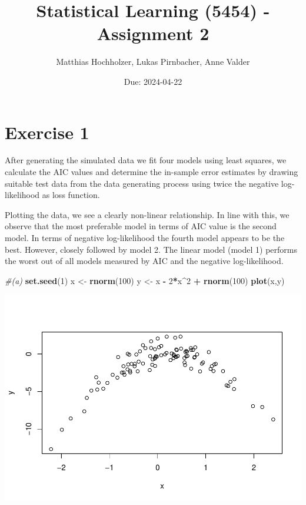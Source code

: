 \documentclass[
]{article}
\title{Statistical Learning (5454) - Assignment 2}
\author{Matthias Hochholzer, Lukas Pirnbacher, Anne Valder}
\date{Due: 2024-04-22}
\newenvironment{Shaded}{\begin{snugshade}}{\end{snugshade}}
\newcommand{\CommentTok}[1]{\textcolor[rgb]{0.56,0.35,0.01}{\textit{#1}}}
\newcommand{\DecValTok}[1]{\textcolor[rgb]{0.00,0.00,0.81}{#1}}
\newcommand{\FunctionTok}[1]{\textcolor[rgb]{0.13,0.29,0.53}{\textbf{#1}}}
\newcommand{\NormalTok}[1]{#1}
\newcommand{\OtherTok}[1]{\textcolor[rgb]{0.56,0.35,0.01}{#1}}
\newcommand{\SpecialCharTok}[1]{\textcolor[rgb]{0.81,0.36,0.00}{\textbf{#1}}}
\begin{document}
\maketitle

\hypertarget{exercise-1}{%
\section{Exercise 1}\label{exercise-1}}

After generating the simulated data we fit four models using least
squares, we calculate the AIC values and determine the in-sample error
estimates by drawing suitable test data from the data generating process
using twice the negative log-likelihood as loss function.

Plotting the data, we see a clearly non-linear relationship. In line
with this, we observe that the most preferable model in terms of AIC
value is the second model. In terms of negative log-likelihood the
fourth model appears to be the best. However, closely followed by model
2. The linear model (model 1) performs the worst out of all models
measured by AIC and the negative log-likelihood.

\begin{Shaded}
\begin{Highlighting}[]
\CommentTok{\#(a)}
\FunctionTok{set.seed}\NormalTok{(}\DecValTok{1}\NormalTok{)}
\NormalTok{x }\OtherTok{\textless{}{-}} \FunctionTok{rnorm}\NormalTok{(}\DecValTok{100}\NormalTok{)}
\NormalTok{y }\OtherTok{\textless{}{-}}\NormalTok{ x }\SpecialCharTok{{-}} \DecValTok{2}\SpecialCharTok{*}\NormalTok{x}\SpecialCharTok{\^{}}\DecValTok{2} \SpecialCharTok{+} \FunctionTok{rnorm}\NormalTok{(}\DecValTok{100}\NormalTok{)}
\FunctionTok{plot}\NormalTok{(x,y)}
\end{Highlighting}
\end{Shaded}

\includegraphics{A2_files/figure-latex/unnamed-chunk-3-1.pdf}
\end{document}
